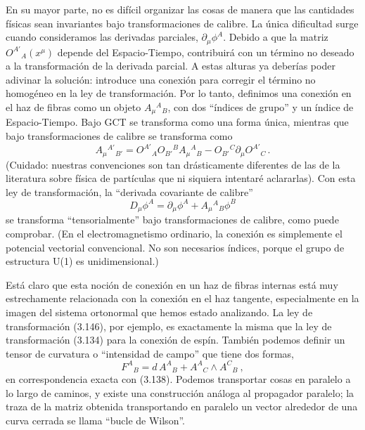 \documentclass[11pt,b5paper,openany,twoside]{book}
\newcommand{\p}[1]{{\partial_{#1}}}
\begin{document}
En su mayor parte, no es difícil organizar las cosas de manera que las cantidades físicas sean invariantes bajo transformaciones de calibre.
La única dificultad surge cuando consideramos las derivadas parciales, $\p\mu \phi^A$.
Debido a que la matriz $O^{A'}{}_A(x^\mu)$ depende del Espacio-Tiempo, contribuirá con un término no deseado a la transformación de la derivada parcial.
A estas alturas ya deberías poder adivinar la solución: introduce una conexión para corregir el término no homogéneo en la ley de transformación.
Por lo tanto, definimos una conexión en el haz de fibras como un objeto $A_\mu{}^A{}_B$, con dos ``índices de grupo'' y un índice de Espacio-Tiempo.
Bajo GCT se transforma como una forma única, mientras que bajo transformaciones de calibre se transforma como
\begin{equation}
A_\mu{}^{A'}{}_{B'} = O^{A'}{}_A O_{B'}{}^B A_\mu{}^A{}_B
- O_{B'}{}^C\p\mu O^{A'}{}_C\,.\label{3.146}
\end{equation}
(Cuidado: nuestras convenciones son tan drásticamente diferentes de las de la literatura sobre física de partículas que ni siquiera intentaré aclararlas).
Con esta ley de transformación, la ``derivada covariante de calibre''
\begin{equation}
D_\mu \phi^A = \p\mu\phi^A + A_\mu{}^A{}_B\phi^B\label{3.147}
\end{equation}
se transforma ``tensorialmente'' bajo transformaciones de calibre, como puede comprobar.
(En el electromagnetismo ordinario, la conexión es simplemente el potencial vectorial convencional.
No son necesarios índices, porque el grupo de estructura U(1) es unidimensional.)

Está claro que esta noción de conexión en un haz de fibras internas está muy estrechamente relacionada con la conexión en el haz tangente, especialmente en la imagen del sistema ortonormal que hemos estado analizando.
La ley de transformación (3.146), por ejemplo, es exactamente la misma que la ley de transformación (3.134) para la conexión de espín.
También podemos definir un tensor de curvatura o ``intensidad de campo'' que tiene dos formas,
\begin{equation}
F^A{}_B =  d\,A^A{}_B + A^A{}_C\wedge A^C{}_B\ ,\label{3.148}
\end{equation}
en correspondencia exacta con (3.138).
Podemos transportar cosas en paralelo a lo largo de caminos, y existe una construcción análoga al propagador paralelo; la traza de la matriz obtenida transportando en paralelo un vector alrededor de una curva cerrada se llama ``bucle de Wilson''.
\end{document}
